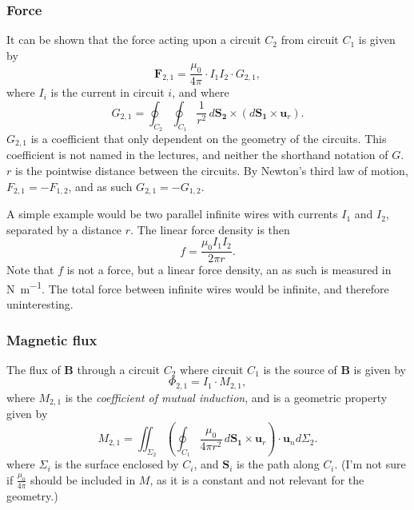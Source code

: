 \documentclass[a4paper, 12pt]{article}
\renewcommand{\vec}[1]{\mathbf{#1}}
\newcommand{\B}{\ensuremath{\vec{B}}}
\begin{document}
        \subsubsection{Force}
            It can be shown that the force acting upon a circuit $C_2$ from circuit $C_1$ is given by
            \begin{equation}
                \vec{F}_{2,1} = \frac{\mu_0}{4\pi}\cdot I_1 I_2 \cdot G_{2,1},
            \end{equation}
            where $I_i$ is the current in circuit $i$, and where 
            \begin{equation}
                G_{2,1} = \oint_{C_2} \oint_{C_1} \frac{1}{r^2}\,d\vec{S_2}\times\left(d\vec{S_1} \times \vec{u}_r\right).
            \end{equation}
            $G_{2,1}$ is a coefficient that only dependent on the geometry of the circuits. 
            This coefficient is not named in the lectures, and neither the shorthand notation of $G$.
            $r$ is the pointwise distance between the circuits. By Newton's third law of motion, $F_{2,1} = -F_{1,2}$, and as such $G_{2,1} = - G_{1,2}$.

            A simple example would be two parallel infinite wires with currents $I_1$ and $I_2$, separated by a distance $r$. The linear force density is then
            \begin{equation}
                f = \frac{\mu_0 I_1 I_2}{2\pi r}.
            \end{equation}
            Note that $f$ is not a force, but a linear force density, an as such is measured in \si{\newton\per\metre}. The total force between infinite wires would be infinite, and therefore uninteresting.
        \subsubsection{Magnetic flux}
            The flux of \B{} through a circuit $C_2$ where circuit $C_1$ is the source of \B{} is given by
            \begin{equation}
                \Phi_{2,1} = I_1 \cdot M_{2,1},
            \end{equation}
            where $M_{2,1}$ is the \textit{coefficient of mutual induction}, and is a geometric property given by
            \begin{equation}
                M_{2,1} = \iint_{\Sigma_2} \left(\oint_{C_1}\frac{\mu_0}{4\pi r^2}\,d\vec{S_1}\times \vec{u}_r \right)\cdot \vec{u}_n d\Sigma_2.
            \end{equation}
            where $\Sigma_i$ is the surface enclosed by $C_i$, and $\vec{S}_i$ is the path along $C_i$.
            (I'm not sure if $\frac{\mu_0}{4\pi}$ should be included in $M$, as it is a constant and not relevant for the geometry.)
\end{document}
